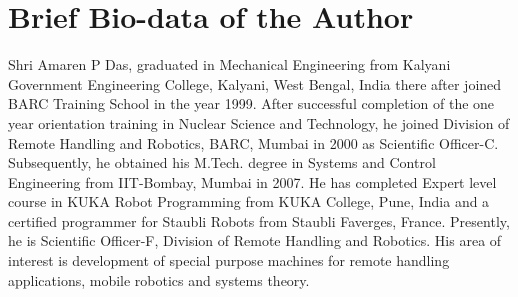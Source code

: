 \chapter*{\textbf{Brief Bio-data of the Author}}
Shri Amaren P Das, graduated in Mechanical Engineering from Kalyani Government Engineering College, Kalyani, West Bengal, India there after joined BARC Training School in the year 1999. After successful completion of the one year orientation training in Nuclear Science and Technology, he joined Division of Remote Handling and Robotics, BARC, Mumbai in 2000 as Scientific Officer-C. Subsequently, he obtained his M.Tech. degree in Systems and Control Engineering from IIT-Bombay, Mumbai in 2007. He has completed Expert level course in KUKA Robot Programming from KUKA College, Pune, India and a certified programmer for Staubli Robots from Staubli Faverges, France.   Presently, he is Scientific Officer-F, Division of Remote Handling and Robotics. His area of interest is development of special purpose machines for remote handling applications, mobile robotics and systems theory. 